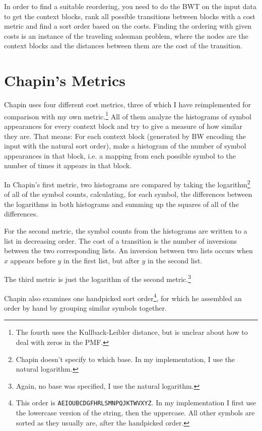 \documentclass[a4paper]{scrreprt}
\begin{document}
In order to find a suitable reordering, you need to do the BWT on the input data
to get the context blocks, rank all possible transitions between blocks with a
cost metric and find a sort order based on the costs. Finding the ordering with
given costs is an instance of the traveling salesman problem, where the nodes
are the context blocks and the distances between them are the cost of the
transition.

\section{Chapin's Metrics}

Chapin uses four different cost metrics, three of which I have reimplemented for
comparison with my own metric.\footnote{The fourth uses the Kullback-Leibler
distance, but is unclear about how to deal with zeros in the PMF.} All of them
analyze the histograms of symbol appearances for every context block and try to
give a measure of how similar they are. That means: For each context block
(generated by BW encoding the input with the natural sort order), make a
histogram of the number of symbol appearances in that block, i.e. a mapping from
each possible symbol to the number of times it appears in that block.

In Chapin's first metric, two histograms are compared by taking the
logarithm\footnote{Chapin doesn't specify to which base. In my implementation,
I use the natural logarithm.} of all of the symbol counts, calculating, for each
symbol, the differences between the logarithms in both histograms and summing up
the squares of all of the differences.

For the second metric, the symbol counts from the histograms are written to a
list in decreasing order. The cost of a transition is the number of inversions
between the two corresponding lists. An inversion between two lists occurs when
\(x\) appears before \(y\) in the first list, but after \(y\) in the second
list.

The third metric is just the logarithm of the second metric.\footnote{Again, no
base was specified, I use the natural logarithm.}

Chapin also examines one handpicked sort order\footnote{This order is
\texttt{AEIOUBCDGFHRLSMNPQJKTWVXYZ}. In my implementation I first use the
lowercase version of the string, then the uppercase. All other symbols are
sorted as they usually are, after the handpicked order.}, for which he assembled
an order by hand by grouping similar symbols together.
\end{document}

